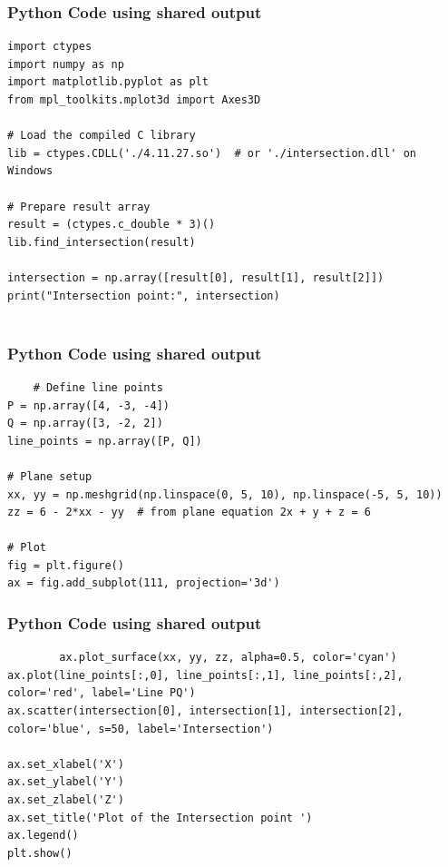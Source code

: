 \documentclass{beamer}
\begin{document}
\begin{frame}[fragile]
	\frametitle{Python Code using shared output}
	\begin{lstlisting}
import ctypes
import numpy as np
import matplotlib.pyplot as plt
from mpl_toolkits.mplot3d import Axes3D

# Load the compiled C library
lib = ctypes.CDLL('./4.11.27.so')  # or './intersection.dll' on Windows

# Prepare result array
result = (ctypes.c_double * 3)()
lib.find_intersection(result)

intersection = np.array([result[0], result[1], result[2]])
print("Intersection point:", intersection)


	\end{lstlisting}
\end{frame}
\begin{frame}[fragile]
	\frametitle{Python Code using shared output}
	\begin{lstlisting}	
    # Define line points
P = np.array([4, -3, -4])
Q = np.array([3, -2, 2])
line_points = np.array([P, Q])

# Plane setup
xx, yy = np.meshgrid(np.linspace(0, 5, 10), np.linspace(-5, 5, 10))
zz = 6 - 2*xx - yy  # from plane equation 2x + y + z = 6

# Plot
fig = plt.figure()
ax = fig.add_subplot(111, projection='3d')
\end{lstlisting}
\end{frame}
\begin{frame}[fragile]
  \frametitle{Python Code using shared output}
    \begin{lstlisting}
        ax.plot_surface(xx, yy, zz, alpha=0.5, color='cyan')
ax.plot(line_points[:,0], line_points[:,1], line_points[:,2], color='red', label='Line PQ')
ax.scatter(intersection[0], intersection[1], intersection[2], color='blue', s=50, label='Intersection')

ax.set_xlabel('X')
ax.set_ylabel('Y')
ax.set_zlabel('Z')
ax.set_title('Plot of the Intersection point ')
ax.legend()
plt.show()
    \end{lstlisting}
\end{frame}
\end{document}

